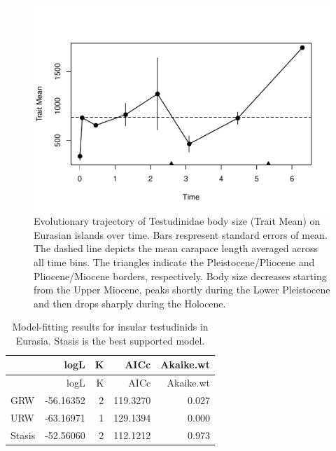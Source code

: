 \begin{figure}[H]
	\centering
	\includegraphics{MA_JJ_files/figure-latex/pTSEsI-1.pdf}
	\caption[PaleoTS plot of insular \T in Eurasia]{Evolutionary trajectory of Testudinidae body size (Trait Mean) on Eurasian islands over time. Bars respresent standard errors of mean. The dashed line depicts the mean carapace length averaged across all time bins. The triangles indicate the Pleistocene/Pliocene and Pliocene/Miocene borders, respectively. Body size decreases starting from the Upper Miocene, peaks shortly during the Lower Pleistocene and then drops sharply during the Holocene.
	}
	\label{fig:pTSEsI}
\end{figure}

\begin{longtable}[]{@{}lrrrr@{}}
	\caption[Model fits for insular \T in Eurasia]{Model-fitting results for insular testudinids in Eurasia. Stasis is the best supported model.}
	\label{tab:pTSEsI}
	\tabularnewline
	\toprule
	& logL & K & AICc & Akaike.wt\tabularnewline
	\midrule
	\endfirsthead
	\toprule
	& logL & K & AICc & Akaike.wt\tabularnewline
	\midrule
	\endhead
	GRW & -56.16352 & 2 & 119.3270 & 0.027\tabularnewline
	URW & -63.16971 & 1 & 129.1394 & 0.000\tabularnewline
	Stasis & -52.56060 & 2 & 112.1212 & 0.973\tabularnewline
	\bottomrule
\end{longtable}


\FloatBarrier






